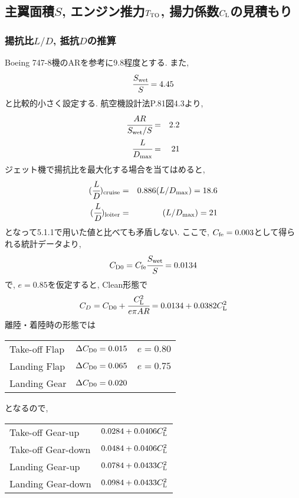 \documentclass[12pt]{jsarticle}
\begin{document}
\subsection{主翼面積$S$, エンジン推力$T_{\rm TO}$, 揚力係数$C_{\rm L}$の見積もり}
\subsubsection{揚抗比$L/D$, 抵抗$D$の推算}
Boeing 747-8機のARを参考に9.8程度とする. また, 
\begin{eqnarray*}
\cfrac{S_{\rm wet}}{S} = 4.45
\end{eqnarray*}
と比較的小さく設定する. 航空機設計法P.81図4.3より,
\begin{eqnarray*}
\cfrac{AR}{S_{\rm wet}/S} &=& 2.2 \\
\cfrac{L}{D_{\rm max}} &=& 21
\end{eqnarray*}
ジェット機で揚抗比を最大化する場合を当てはめると,
\begin{eqnarray*}
(\cfrac{L}{D})_{\rm cruise} &=& 0.886 (L/D_{\rm max}) = 18.6 \\
(\cfrac{L}{D})_{\rm loiter} &=& (L/D_{\rm max}) = 21 
\end{eqnarray*}
となって5.1.1で用いた値と比べても矛盾しない. ここで, $C_{\rm fe} = 0.003$として得られる統計データより,
\begin{eqnarray*}
C_{\rm D0} = C_{\rm fe}\cfrac{S_{\rm wet}}{S} = 0.0134 
\end{eqnarray*}
で, $e=0.85$を仮定すると, Clean形態で
\begin{eqnarray*}
C_D = C_{\rm D0} + \cfrac{C_{\rm L}^2}{e\pi AR} =  0.0134 + 0.0382C_{\rm L}^2
\end{eqnarray*}
離陸・着陸時の形態では
\begin{table}[H]
	\begin{center}
		\begin{tabular}{lll}
			Take-off Flap & $\Delta C_{\rm D0} = 0.015$ & $e = 0.80$ \\
			Landing Flap & $\Delta C_{\rm D0} = 0.065$ & $e = 0.75$ \\
			Landing Gear & $\Delta C_{\rm D0} = 0.020$ &  \\ 
		\end{tabular}
	\end{center}
\end{table}
となるので,
\begin{table}[h]
	\begin{center}
		\begin{tabular}{ll}
			Take-off Gear-up & $0.0284 + 0.0406 C_{\rm L}^2$ \\
			Take-off Gear-down & $0.0484 + 0.0406 C_{\rm L}^2$ \\
			Landing Gear-up & $0.0784 + 0.0433 C_{\rm L}^2$ \\
			Landing Gear-down & $0.0984 + 0.0433 C_{\rm L}^2$ \\ 
		\end{tabular}
	\end{center}
\end{table}
\end{document}
